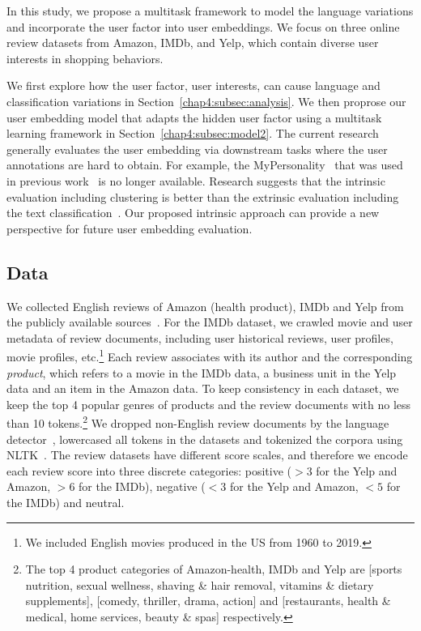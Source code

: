 In this study, we propose a multitask framework to model the language variations and incorporate the user factor into user embeddings.
We focus on three online review datasets from Amazon, IMDb, and Yelp, which contain diverse user interests in shopping behaviors.

We first explore how the user factor, user interests, can cause language and classification variations in Section~\ref{chap4:subsec:analysis}.
We then proprose our user embedding model that adapts the hidden user factor using a multitask learning framework in Section~\ref{chap4:subsec:model2}.
The current research~\cite{pan2019social} generally evaluates the user embedding via downstream tasks where the user annotations are hard to obtain. 
For example, the MyPersonality~\cite{kosinski2015facebook} that was used in previous work~\cite{ding2017multi, farnadi2018user, pan2019social} is no longer available. 
Research suggests that the intrinsic evaluation including clustering is better than the extrinsic evaluation including the text classification~\cite{schnabel2015evaluation}.
Our proposed intrinsic approach can provide a new perspective for future user embedding evaluation.


\subsection{Data}
\label{chap4:subsec:data2}

We collected English reviews of Amazon (health product), IMDb and Yelp from the publicly available sources~\cite{he2016ups, yelp_2019, imdb2020dataset}.
For the IMDb dataset, we crawled movie and user metadata of review documents, including user historical reviews, user profiles, movie profiles, etc.\footnote{We included English movies produced in the US from 1960 to 2019.}
Each review associates with its author and the corresponding \textit{product}, which refers to a movie in the IMDb data, a business unit in the Yelp data and an item in the Amazon data.
To keep consistency in each dataset, we keep the top 4 popular genres of products and the review documents with no less than 10 tokens.\footnote{The top 4 product categories of Amazon-health, IMDb and Yelp are [sports nutrition, sexual wellness, shaving \& hair removal, vitamins \& dietary supplements], [comedy, thriller, drama, action] and [restaurants, health \& medical, home services, beauty \& spas] respectively.}
We dropped non-English review documents by the language detector~\cite{lui2012langid}, lowercased all tokens in the datasets and tokenized the corpora using NLTK~\cite{bird2004nltk}.
The review datasets have different score scales, and therefore we encode each review score into three discrete categories: positive ($>3$ for the Yelp and Amazon, $>6$ for the IMDb), negative ($<3$ for the Yelp and Amazon, $<5$ for the IMDb) and neutral.


